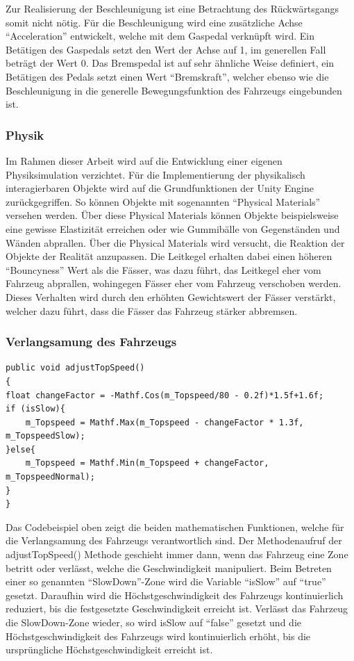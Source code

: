 	Zur Realisierung der Beschleunigung ist eine Betrachtung des Rückwärtsgangs somit nicht nötig. Für die Beschleunigung wird eine zusätzliche Achse \enquote{Acceleration} entwickelt, welche mit dem Gaspedal verknüpft wird. Ein Betätigen des Gaspedals setzt den Wert der Achse auf 1, im generellen Fall beträgt der Wert 0. Das Bremspedal ist auf sehr ähnliche Weise definiert, ein Betätigen des Pedals setzt einen Wert \enquote{Bremskraft}, welcher ebenso wie die Beschleunigung in die generelle Bewegungsfunktion des Fahrzeugs eingebunden ist.


	\subsubsection{Physik}
	Im Rahmen dieser Arbeit wird auf die Entwicklung einer eigenen Physiksimulation verzichtet. Für die Implementierung der physikalisch interagierbaren Objekte wird auf die Grundfunktionen der Unity Engine zurückgegriffen. So können Objekte mit sogenannten \enquote{Physical Materials} versehen werden. Über diese Physical Materials können Objekte beispielsweise eine gewisse Elastizität erreichen oder wie Gummibälle von Gegenständen und Wänden abprallen. Über die Physical Materials wird versucht, die Reaktion der Objekte der Realität anzupassen. Die Leitkegel erhalten dabei einen höheren \enquote{Bouncyness} Wert als die Fässer, was dazu führt, das Leitkegel eher vom Fahrzeug abprallen, wohingegen Fässer eher vom Fahrzeug verschoben werden. Dieses Verhalten wird durch den erhöhten Gewichtswert der Fässer verstärkt, welcher dazu führt, dass die Fässer das Fahrzeug stärker abbremsen.

	\subsubsection{Verlangsamung des Fahrzeugs}\label{sssec:capspeed}
	\begin{lstlisting}
public void adjustTopSpeed()
{
float changeFactor = -Mathf.Cos(m_Topspeed/80 - 0.2f)*1.5f+1.6f;
if (isSlow){
    m_Topspeed = Mathf.Max(m_Topspeed - changeFactor * 1.3f, m_TopspeedSlow);
}else{
    m_Topspeed = Mathf.Min(m_Topspeed + changeFactor, m_TopspeedNormal);
}
}
    \end{lstlisting}
    Das Codebeispiel oben zeigt die beiden mathematischen Funktionen, welche für die Verlangsamung des Fahrzeugs verantwortlich sind. Der Methodenaufruf der adjustTopSpeed() Methode geschieht immer dann, wenn das Fahrzeug eine Zone betritt oder verlässt, welche die Geschwindigkeit manipuliert. Beim Betreten einer so genannten \enquote{SlowDown}-Zone wird die Variable \enquote{isSlow} auf \enquote{true} gesetzt. Daraufhin wird die Höchstgeschwindigkeit des Fahrzeugs kontinuierlich reduziert, bis die festgesetzte Geschwindigkeit erreicht ist. Verlässt das Fahrzeug die SlowDown-Zone wieder, so wird isSlow auf \enquote{false} gesetzt und die Höchstgeschwindigkeit des Fahrzeugs wird kontinuierlich erhöht, bis die ursprüngliche Höchstgeschwindigkeit erreicht ist.

